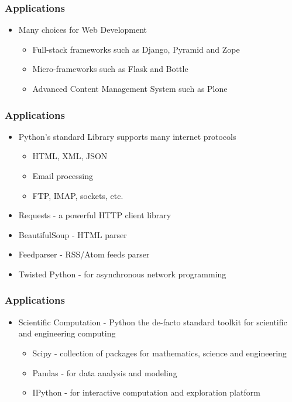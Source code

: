 \documentclass[14pt]{beamer}
\begin{document}
    \begin{frame}
        \frametitle{Applications}
        \begin{itemize}
            \item Many choices for Web Development
                \begin{itemize}
                    \item Full-stack frameworks such as Django, Pyramid and Zope
                    \item Micro-frameworks such as Flask and Bottle
                    \item Advanced Content Management System such as Plone
                \end{itemize}
        \end{itemize}
    \end{frame}
    \begin{frame}
        \frametitle{Applications}
        \begin{itemize}
            \item  Python’s standard Library supports many internet protocols
                \begin{itemize}
                    \item HTML, XML, JSON
                    \item Email processing
                    \item FTP, IMAP, sockets, etc.
                \end{itemize}
            \item Requests - a powerful HTTP client library
            \item BeautifulSoup - HTML parser
            \item Feedparser - RSS/Atom feeds parser
            \item Twisted Python - for asynchronous network programming
        \end{itemize}
    \end{frame}
    \begin{frame}
        \frametitle{Applications}
        \begin{itemize}
            \item Scientific Computation - Python the de-facto standard toolkit for scientific and engineering computing
                \begin{itemize}
                    \item Scipy - collection of packages for mathematics, science and engineering
                    \item Pandas - for data analysis and modeling
                    \item IPython - for interactive computation and exploration platform
                \end{itemize}
        \end{itemize}
    \end{frame}
\end{document}
